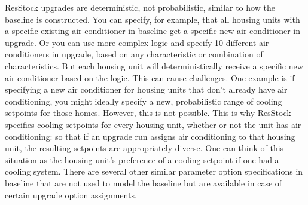 ResStock upgrades are deterministic, not probabilistic, similar to how the baseline is constructed. You can specify, for example, that all housing units with a specific existing air conditioner in baseline get a specific new air conditioner in upgrade. Or you can use more complex logic and specify 10 different air conditioners in upgrade, based on any characteristic or combination of characteristics. But each housing unit will deterministically receive a specific new air conditioner based on the logic. This can cause challenges. One example is if specifying a new air conditioner for housing units that don't already have air conditioning, you might ideally specify a new, probabilistic range of cooling setpoints for those homes. However, this is not possible. This is why ResStock specifies cooling setpoints for every housing unit, whether or not the unit has air conditioning: so that if an upgrade run assigns air conditioning to that housing unit, the resulting setpoints are appropriately diverse. One can think of this situation as the housing unit's preference of a cooling setpoint if one had a cooling system. There are several other similar parameter option specifications in baseline that are not used to model the baseline but are available in case of certain upgrade option assignments. 




